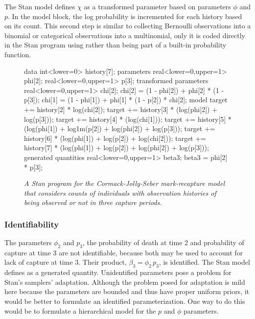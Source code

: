 The Stan model defines $\chi$ as a transformed parameter based on
parameters $\phi$ and $p$.  In the model block, the log probability is
incremented for each history based on its count.  This second step is
similar to collecting Bernoulli observations into a binomial or
categorical observations into a multinomial, only it is coded directly
in the Stan program using  rather than
being part of a built-in probability function.
%
\begin{figure}
\begin{stancode}
data {
  int<lower=0> history[7];
}
parameters {
  real<lower=0,upper=1> phi[2];
  real<lower=0,upper=1> p[3];
}
transformed parameters {
  real<lower=0,upper=1> chi[2];  
  chi[2] = (1 - phi[2]) + phi[2] * (1 - p[3]);
  chi[1] = (1 - phi[1]) + phi[1] * (1 - p[2]) * chi[2];
}
model {
  target += history[2] * log(chi[2]);
  target += history[3] * (log(phi[2]) + log(p[3]));
  target += history[4] * (log(chi[1]));
  target += history[5] * (log(phi[1]) + log1m(p[2])
                            + log(phi[2]) + log(p[3]));
  target += history[6] * (log(phi[1]) + log(p[2]) 
                            + log(chi[2]));
  target += history[7] * (log(phi[1]) + log(p[2]) 
                            + log(phi[2]) + log(p[3]));
}
generated quantities {
  real<lower=0,upper=1> beta3;
  beta3 = phi[2] * p[3];
}
\end{stancode}
\vspace*{-12pt}
\caption{\small\it A Stan program for the Cormack-Jolly-Seber
  mark-recapture model that considers counts of individuals with
  observation histories of being observed or not in three capture
  periods.}\label{cjs-history.figure}
\end{figure}
%

\subsubsection{Identifiability}

The parameters $\phi_2$ and $p_3$, the probability of death at time 2
and probability of capture at time 3 are not identifiable, because both
may be used to account for lack of capture at time 3.  Their product,
$\beta_3 = \phi_2 \, p_3$, is identified.  The Stan model defines
 as a generated quantity.  Unidentified parameters pose a
problem for Stan's samplers' adaptation.  Although the problem posed
for adaptation is mild here because the parameters are bounded and
thus have proper uniform priors, it would be better to formulate an
identified parameterization.  One way to do this would be to formulate
a hierarchical model for the $p$ and $\phi$ parameters.

